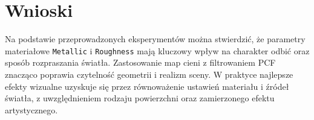 \documentclass[12pt,a4paper]{article}
\begin{document}
\section{Wnioski}
Na podstawie przeprowadzonych eksperymentów można stwierdzić, że parametry materiałowe \texttt{Metallic} i \texttt{Roughness} mają kluczowy wpływ na charakter odbić oraz sposób rozpraszania światła. Zastosowanie map cieni z filtrowaniem PCF znacząco poprawia czytelność geometrii i realizm sceny. W praktyce najlepsze efekty wizualne uzyskuje się przez równoważenie ustawień materiału i źródeł światła, z uwzględnieniem rodzaju powierzchni oraz zamierzonego efektu artystycznego.
\end{document}
